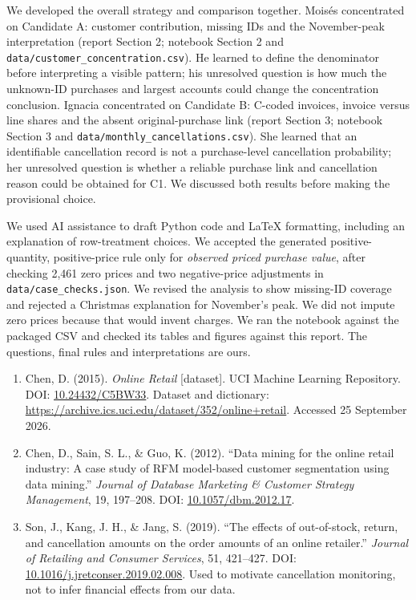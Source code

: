 \documentclass[10pt,a4paper]{article}
\newcommand{\sectionhead}[1]{\vspace{0.34em}{\large\bfseries\color{navy}#1}\par\vspace{0.08em}}
\newcommand{\subhead}[1]{\vspace{0.18em}{\bfseries #1}\par}
\begin{document}
\subhead{Individual contributions and reflection}
We developed the overall strategy and comparison together. Mois\'{e}s concentrated on Candidate A: customer contribution, missing IDs and the November-peak interpretation (report Section 2; notebook Section 2 and \texttt{data/customer\_concentration.csv}). He learned to define the denominator before interpreting a visible pattern; his unresolved question is how much the unknown-ID purchases and largest accounts could change the concentration conclusion. Ignacia concentrated on Candidate B: C-coded invoices, invoice versus line shares and the absent original-purchase link (report Section 3; notebook Section 3 and \texttt{data/monthly\_cancellations.csv}). She learned that an identifiable cancellation record is not a purchase-level cancellation probability; her unresolved question is whether a reliable purchase link and cancellation reason could be obtained for C1. We discussed both results before making the provisional choice.

\subhead{AI use and accountability}
We used AI assistance to draft Python code and LaTeX formatting, including an explanation of row-treatment choices. We accepted the generated positive-quantity, positive-price rule only for \emph{observed priced purchase value}, after checking 2,461 zero prices and two negative-price adjustments in \texttt{data/case\_checks.json}. We revised the analysis to show missing-ID coverage and rejected a Christmas explanation for November's peak. We did not impute zero prices because that would invent charges. We ran the notebook against the packaged CSV and checked its tables and figures against this report. The questions, final rules and interpretations are ours.
\endgroup

\sectionhead{References}
\begingroup\small
\begin{enumerate}[leftmargin=1.4em,itemsep=0em,parsep=0em]
\item Chen, D. (2015). \emph{Online Retail} [dataset]. UCI Machine Learning Repository. DOI: \href{https://doi.org/10.24432/C5BW33}{10.24432/C5BW33}. Dataset and dictionary: \url{https://archive.ics.uci.edu/dataset/352/online+retail}. Accessed 25 September 2026.
\item Chen, D., Sain, S. L., \& Guo, K. (2012). ``Data mining for the online retail industry: A case study of RFM model-based customer segmentation using data mining.'' \emph{Journal of Database Marketing \& Customer Strategy Management}, 19, 197--208. DOI: \href{https://doi.org/10.1057/dbm.2012.17}{10.1057/dbm.2012.17}.
\item Son, J., Kang, J. H., \& Jang, S. (2019). ``The effects of out-of-stock, return, and cancellation amounts on the order amounts of an online retailer.'' \emph{Journal of Retailing and Consumer Services}, 51, 421--427. DOI: \href{https://doi.org/10.1016/j.jretconser.2019.02.008}{10.1016/j.jretconser.2019.02.008}. Used to motivate cancellation monitoring, not to infer financial effects from our data.
\end{enumerate}
\endgroup
\end{document}

